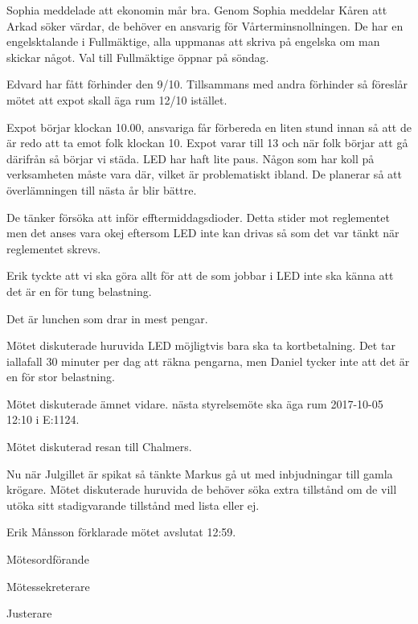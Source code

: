 \documentclass[10pt]{article}
\def\mo{Erik Månsson}
\def\ms{Johan Karlberg}
\def\ji{Markus Rahne}
\begin{document}
\begin{paragrafer}
\begin{paragrafer}
Sophia meddelade att ekonomin mår bra.
Genom Sophia meddelar Kåren att Arkad söker värdar, de behöver en ansvarig för Vårterminsnollningen. De har en engelsktalande i Fullmäktige, alla uppmanas att skriva på engelska om man skickar något. Val till Fullmäktige öppnar på söndag.
\end{paragrafer}

Edvard har fått förhinder den 9/10. Tillsammans med andra förhinder så föreslår mötet att expot skall äga rum 12/10 istället.

Expot börjar klockan 10.00, ansvariga får förbereda en liten stund innan så att de är redo att ta emot folk klockan 10. Expot varar till 13 och när folk börjar att gå därifrån så börjar vi städa.
LED har haft lite paus. Någon som har koll på verksamheten måste vara där, vilket är problematiskt ibland. De planerar så att överlämningen till nästa år blir bättre.

De tänker försöka att inför efftermiddagsdioder. Detta stider mot reglementet men det anses vara okej eftersom LED inte kan drivas så som det var tänkt när reglementet skrevs.

Erik tyckte att vi ska göra allt för att de som jobbar i LED inte ska känna att det är en för tung belastning.

Det är lunchen som drar in mest pengar.

Mötet diskuterade huruvida LED möjligtvis bara ska ta kortbetalning. Det tar iallafall 30 minuter per dag att räkna pengarna, men Daniel tycker inte att det är en för stor belastning.

Mötet diskuterade ämnet vidare.
{\Mba} nästa styrelsemöte ska äga rum 2017-10-05 12:10 i E:1124.

{\Ibfu}

Mötet diskuterad resan till Chalmers.

Nu när Julgillet är spikat så tänkte Markus gå ut med inbjudningar till gamla krögare. Mötet diskuterade huruvida de behöver söka extra tillstånd om de vill utöka sitt stadigvarande tillstånd med lista eller ej.

{\mo} förklarade mötet avslutat 12:59.

\end{paragrafer}

\hidesignfoot
\begin{signatures}{3}
\signature{\mo}{Mötesordförande}
\signature{\ms}{Mötessekreterare}
\signature{\ji}{Justerare}
\end{signatures}
\end{document}
